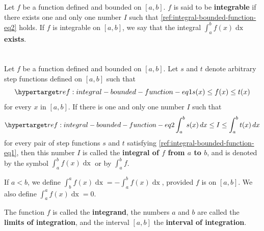 \documentclass{report}
\begin{document}
\section{}%

  Let $f$ be a function defined and bounded on $[a, b]$.
  $f$ is said to be \textbf{integrable} if there exists one and only one number
    $I$ such that \eqref{ref:integral-bounded-function-eq2} holds.
  If $f$ is integrable on $[a, b]$, we say that the integral
    $\int_a^b f(x) \mathop{dx}$ \textbf{exists}.

\section{}%

  Let $f$ be a function defined and bounded on $[a, b]$.
  Let $s$ and $t$ denote arbitrary step functions defined on $[a, b]$ such that
    \begin{equation}
      \hyperlabel{ref:integral-bounded-function-eq1}
      s(x) \leq f(x) \leq t(x)
    \end{equation}
    for every $x$ in $[a, b]$.
  If there is one and only one number $I$ such that
    \begin{equation}
      \hyperlabel{ref:integral-bounded-function-eq2}
      \int_a^b s(x) \mathop{dx} \leq I \leq \int_a^b t(x) \mathop{dx}
    \end{equation}
    for every pair of step functions $s$ and $t$ satisfying
    \eqref{ref:integral-bounded-function-eq1}, then this number $I$ is called
    the \textbf{integral of $f$ from $a$ to $b$}, and is denoted by the symbol
    $\int_a^b f(x) \mathop{dx}$ or by $\int_a^b f$.

  If $a < b$, we define
    $\int_b^a f(x) \mathop{dx} = -\int_a^b f(x) \mathop{dx}$,
    provided $f$ is  on $[a, b]$.
  We also define $\int_a^a f(x) \mathop{dx} = 0$.

  The function $f$ is called the \textbf{integrand}, the numbers $a$ and $b$ are
    called the \textbf{limits of integration}, and the interval $[a, b]$ the
    \textbf{interval of integration}.

\section{}%
\end{document}
